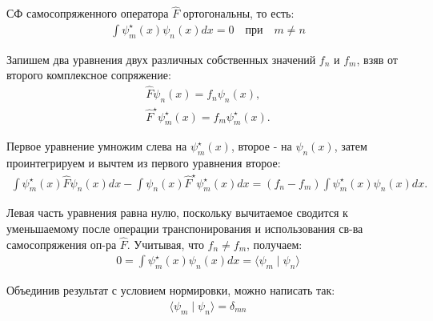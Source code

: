 \documentclass[__main__.tex]{subfiles}
\begin{document}
СФ самосопряженного оператора $\hat F$ ортогональны, то есть:
\begin{gather*}
    \int \psi^{\star}_m(x) \psi_n(x)dx = 0\quad при\quad m\ne n
\end{gather*}

Запишем два уравнения двух различных собственных значений $f_n$ и $f_m$, взяв от второго комплексное сопряжение:
\begin{gather*}
    \hat{F}\psi_n(x)=f_n\psi_n(x),\\
    \hat{F}^\star \psi^\star_m(x)=f_m\psi^\star_m(x).
\end{gather*}

Первое уравнение умножим слева на $\psi^\star_m(x)$, второе - на $\psi_n(x)$, затем проинтегрируем и вычтем из первого уравнения второе:
\begin{gather*}
    \int \psi^\star_m(x)\hat{F}\psi_n(x)dx -
    \int \psi_n(x)\hat{F}^\star \psi^\star_m(x)dx=
    (f_n-f_m)\int \psi^\star_m(x)\psi_n(x)dx.
\end{gather*}

Левая часть уравнения равна нулю, поскольку вычитаемое сводится к уменьшаемому после операции транспонирования и использования св-ва самосопряжения оп-ра $\hat{F}$. Учитывая, что $f_n\ne f_m$, получаем:
\begin{gather*}
    0=\int \psi^\star_m(x)\psi_n(x)dx=
    \langle\psi_m\mid\psi_n\rangle
\end{gather*}

Объединив результат с условием нормировки, можно написать так:
\begin{gather*}
    \langle\psi_m\mid\psi_n\rangle=\delta_{mn}
\end{gather*}
\end{document}
